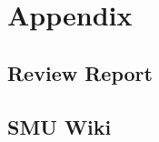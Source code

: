 \section*{Appendix}
\renewcommand*\thesubsection{\Roman{subsection}} %


\subsection{Review Report}
\subsection{SMU Wiki}